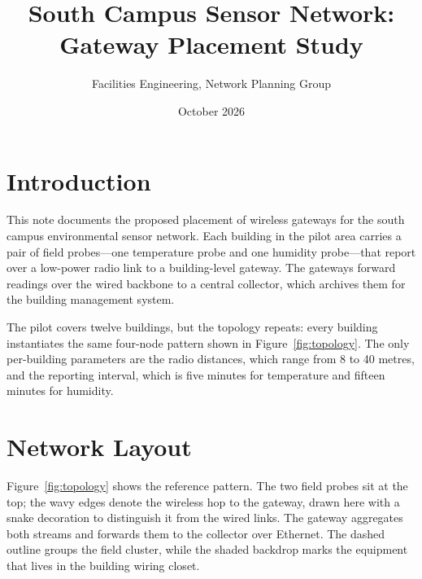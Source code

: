 \documentclass[11pt]{article}
\title{South Campus Sensor Network: Gateway Placement Study}
\author{Facilities Engineering, Network Planning Group}
\date{October 2026}
\begin{document}
\maketitle

\section{Introduction}
This note documents the proposed placement of wireless gateways for the
south campus environmental sensor network. Each building in the pilot
area carries a pair of field probes---one temperature probe and one
humidity probe---that report over a low-power radio link to a
building-level gateway. The gateways forward readings over the wired
backbone to a central collector, which archives them for the building
management system.

The pilot covers twelve buildings, but the topology repeats: every
building instantiates the same four-node pattern shown in
Figure~\ref{fig:topology}. The only per-building parameters are the
radio distances, which range from 8 to 40 metres, and the reporting
interval, which is five minutes for temperature and fifteen minutes
for humidity.

\section{Network Layout}
Figure~\ref{fig:topology} shows the reference pattern. The two field
probes sit at the top; the wavy edges denote the wireless hop to the
gateway, drawn here with a snake decoration to distinguish it from the
wired links. The gateway aggregates both streams and forwards them to
the collector over Ethernet. The dashed outline groups the field
cluster, while the shaded backdrop marks the equipment that lives in
the building wiring closet.
\end{document}
